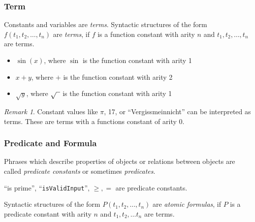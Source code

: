 \documentclass{beamer}
\theoremstyle{remark}
\newtheorem{remark}[theorem]{Remark}
\begin{document}
\begin{frame}
\frametitle{Term}
\begin{definition}
Constants and variables are {\em terms}. Syntactic structures of the form $f(t_1, t_2, \ldots, t_n)$ are {\em terms}, if $f$ is a function constant with arity $n$ and $t_1, t_2, \ldots, t_n$ are terms.
\end{definition}

\pause

\begin{example}
\begin{itemize}
	\item $\sin(x)$, where $\sin$ is the function constant with arity 1
	\pause
	\item $x + y$, where $+$ is the function constant with arity 2
	\pause
	\item $\sqrt{y}$, where $\sqrt{\hspace{.5em}}$ is the function constant with arity 1
\end{itemize}
\end{example}

\pause
\begin{remark}
 Constant values like $\pi$, 17, or ``Vergissmeinnicht'' can be interpreted as terms. These are terms with a functions constant of arity 0.
\end{remark}
\end{frame}

\begin{frame}
\frametitle{Predicate and Formula}

\begin{definition}
Phrases which describe properties of objects or relations between objects are called {\em predicate constants} or sometimes {\em predicates}.\end{definition}

\pause
\begin{example}
	``is prime'', ``{\tt isValidInput}'', $\geq, =$ are predicate constants.
\end{example}
\pause

\begin{definition}
Syntactic structures of the form $P(t_1, t_2, \ldots, t_n)$ are {\em atomic formulas}, if $P$ is a predicate constant with arity $n$ and $t_1, t_2, \ldots t_n$ are terms.
\end{definition}

\end{frame}
\end{document}
